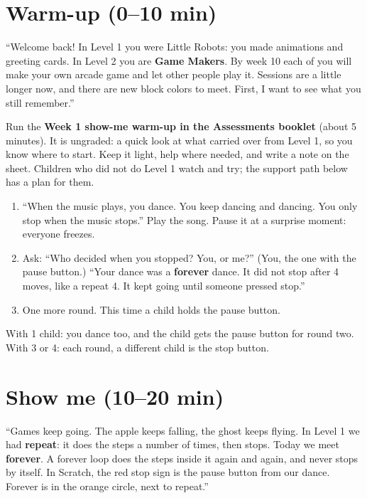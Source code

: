 \section{Warm-up (0--10 min)}
\begin{teacherscript}
\enquote{Welcome back! In Level 1 you were Little Robots: you made animations and greeting cards. In Level 2 you are \textbf{Game Makers}. By week 10 each of you will make your own arcade game and let other people play it. Sessions are a little longer now, and there are new block colors to meet. First, I want to see what you still remember.}
\end{teacherscript}

Run the \textbf{Week 1 show-me warm-up in the Assessments booklet} (about 5 minutes). It is ungraded: a quick look at what carried over from Level 1, so you know where to start. Keep it light, help where needed, and write a note on the sheet. Children who did not do Level 1 watch and try; the support path below has a plan for them.

\begin{unplugged}
\begin{enumerate}[leftmargin=1.4em,itemsep=1pt]
  \item \enquote{When the music plays, you dance. You keep dancing and dancing. You only stop when the music stops.} Play the song. Pause it at a surprise moment: everyone freezes.
  \item Ask: \enquote{Who decided when you stopped? You, or me?} (You, the one with the pause button.) \enquote{Your dance was a \textbf{forever} dance. It did not stop after 4 moves, like a repeat 4. It kept going until someone pressed stop.}
  \item One more round. This time a child holds the pause button.
\end{enumerate}
With 1 child: you dance too, and the child gets the pause button for round two. With 3 or 4: each round, a different child is the stop button.
\end{unplugged}

\section{Show me (10--20 min)}
\begin{teacherscript}
\enquote{Games keep going. The apple keeps falling, the ghost keeps flying. In Level 1 we had \textbf{repeat}: it does the steps a number of times, then stops. Today we meet \textbf{forever}. A forever loop does the steps inside it again and again, and never stops by itself. In Scratch, the red stop sign is the pause button from our dance. Forever is in the orange  circle, next to repeat.}
\end{teacherscript}

